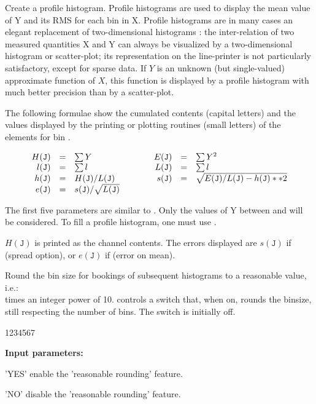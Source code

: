 \Action Create a profile histogram.
Profile histograms are used to display the mean value of Y and
its RMS for each bin in X. Profile histograms are in many cases
an elegant replacement of two-dimensional histograms : the inter-relation
of two measured quantities X and Y can always be visualized
by a two-dimensional histogram or scatter-plot; its representation
on the line-printer is not particularly satisfactory, except
for sparse data. 
If $Y$ is an unknown (but single-valued) approximate
function of $X$, this function is displayed by a profile histogram
with much better precision than by a scatter-plot.
 
The following formulae show the cumulated contents (capital letters)
and the values displayed by the printing or plotting routines
(small letters) of the elements for bin .
 
\newcommand{\J}{\mathtt{J}}
\[
\begin{array}{r@{\quad=\quad}l@{\qquad\qquad}r@{\quad=\quad}l}
H(\J) &  \sum Y                        &
E(\J) &  \sum {Y^{2}}                  \\
l(\J) &  \sum l                        &
L(\J) &  \sum l                        \\
h(\J) & H(\J)/L(\J)                      &
s(\J) & \sqrt{E(\J)/L(\J)-h(\J)**2}       \\
e(\J) & s(\J)  /  \sqrt {L(\J)}
\end{array}
\]
 
The first five parameters are similar to .
Only the values of Y between  and  will be considered.
To fill a profile histogram,
one must use .
 
$H(\J)$ is printed as the channel contents.
The errors displayed are $s(\J)$ if  (spread option),
or $e(\J)$ if  (error on mean).



\Action Round the bin size for bookings of subsequent histograms
to a reasonable value, i.e.:\\
 times an integer power of 10.
 controls a switch that, when on, rounds the binsize, still
respecting the number of bins. The switch is
initially off.

\begin{DLtt}{1234567}
\item[{\rm\bf Input parameters:}]
\item['YES'] enable the 'reasonable rounding' feature.
\item['NO'] disable the 'reasonable rounding' feature.
\end{DLtt}


